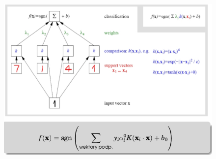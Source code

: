 \documentclass[10pt,a4paper]{article}
\begin{document}
\begin{figure}[H]
  \centering
    \includegraphics[scale=0.50]{images/svm2.png}
\end{figure}
\end{document}
